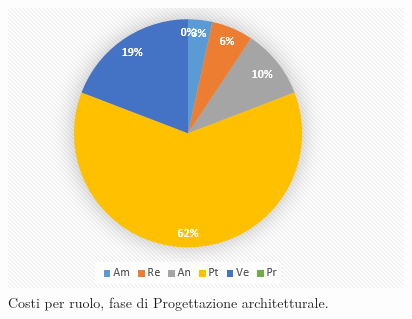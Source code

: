 \documentclass[a4paper]{report}
\begin{document}
			\begin{figure}[H]
				\centering
				\includegraphics[scale=0.7]{PCCostiProgettazione}
				\caption{Costi per ruolo, fase di Progettazione architetturale.}
			\end{figure}
\end{document}
